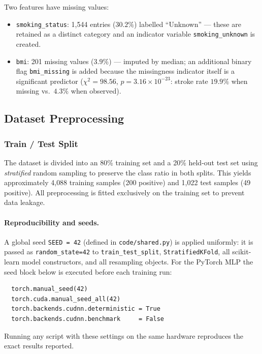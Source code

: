 \documentclass[11pt,a4paper]{article}
\begin{document}
Two features have missing values:
\begin{itemize}
  \item \texttt{smoking\_status}: 1{,}544 entries ($30.2\%$) labelled ``Unknown'' — these are retained as a distinct category and an indicator variable \texttt{smoking\_unknown} is created.
  \item \texttt{bmi}: 201 missing values ($3.9\%$) — imputed by median; an additional binary flag \texttt{bmi\_missing} is added because the missingness indicator itself is a significant predictor ($\chi^{2}=98.56$, $p=3.16\times10^{-23}$: stroke rate $19.9\%$ when missing vs.\ $4.3\%$ when observed).
\end{itemize}

\subsection{Dataset Preprocessing}

\subsubsection{Train / Test Split}

The dataset is divided into an 80\% training set and a 20\% held-out test set using \emph{stratified} random sampling to preserve the class ratio in both splits.
This yields approximately 4{,}088 training samples (200 positive) and 1{,}022 test samples (49 positive).
All preprocessing is fitted exclusively on the training set to prevent data leakage.

\paragraph{Reproducibility and seeds.}
A global seed \texttt{SEED\,=\,42} (defined in \texttt{code/shared.py}) is applied uniformly: it is passed as \texttt{random\_state=42} to \texttt{train\_test\_split}, \texttt{StratifiedKFold}, all scikit-learn model constructors, and all resampling objects.
For the PyTorch MLP the seed block below is executed before each training run:
{\small\begin{verbatim}
  torch.manual_seed(42)
  torch.cuda.manual_seed_all(42)
  torch.backends.cudnn.deterministic = True
  torch.backends.cudnn.benchmark     = False
\end{verbatim}}
Running any script with these settings on the same hardware reproduces the exact results reported.
\end{document}
